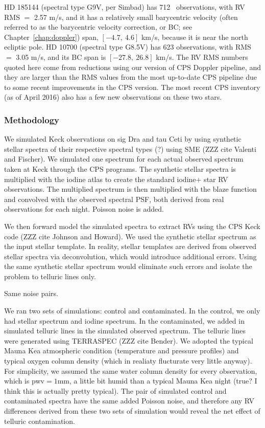 HD 185144 (spectral type G9V, per Simbad) has 712 \keck\ observations,
with RV RMS $=$ 2.57 m/s, and it has a relatively small barycentric
velocity (often referred to as the barycentric velocity correction, or
BC; see Chapter~\ref{chap:doppler}) span, $[-4.7,\ 4.6]$ km/s, because
it is near the north ecliptic pole. HD 10700 (spectral type G8.5V) has
623 observations, with RMS $=$ 3.05 m/s, and its BC span is $[-27.8,\
26.8]$ km/s. The RV RMS numbers quoted here come from reductions using
our version of CPS Doppler pipeline, and they are larger than the RMS
values from the most up-to-date CPS pipeline due to some recent
improvements in the CPS version. The most recent CPS inventory (as of
April 2016) also has a few new observations on these two stars.


\subsubsection{Methodology}\label{keck:telluric:method}

We simulated Keck observations on sig Dra and tau Ceti by using
synthetic stellar spectra of their respective spectral types (?) using
SME (ZZZ cite Valenti and Fischer). We simulated one spectrum for each
actual observed spectrum taken at Keck through the CPS programs. The
synthetic stellar spectra is multiplied with the iodine atlas to
create the standard iodine$+$ star RV observations. The multiplied
spectrum is then multiplied with the blaze function and convolved with
the observed spectral PSF, both derived from real observations for
each night. Poisson noise is added.

We then forward model the simulated spectra to extract RVs using the
CPS Keck code (ZZZ cite Johnson and Howard). We used the synthetic
stellar spectrum as the input stellar template. In reality, stellar
templates are derived from observed stellar spectra via deconvolution,
which would introduce additional errors. Using the same synthetic
stellar spectrum would eliminate such errors and isolate the problem
to telluric lines only.

Same noise pairs.

We ran two sets of simulations: control and contaminated. In the
control, we only had stellar spectrum and iodine spectrum. In the
contaminated, we added in simulated telluric lines in the simulated
observed spectrum. The telluric lines were generated using TERRASPEC
(ZZZ cite Bender). We adopted the typical Mauna Kea atmospheric
condition (temperature and pressure profiles) and typical oxygen
column density (which in realiaty flucturate very little anyway). For
simplicity, we assumed the same water column density for every
observation, which is pwv$=1$mm, a little bit humid than a typical
Mauna Kea night (true? I think this is actually pretty typical). The
pair of simulated control and contaminated spectra have the same added
Poisson noise, and therefore any RV differences derived from these two
sets of simulation would reveal the net effect of telluric
contamination.


